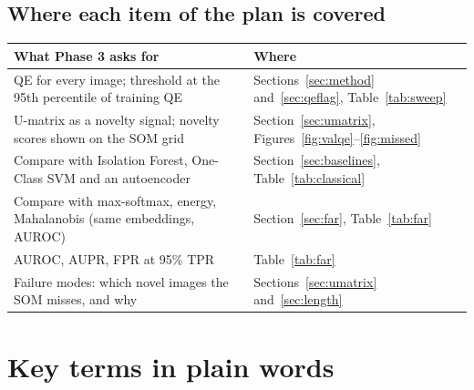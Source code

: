 \documentclass[11pt]{article}
\begin{document}
\subsection*{Where each item of the plan is covered}

{\small
\renewcommand{\arraystretch}{1.12}
\begin{tabularx}{\textwidth}{|>{\raggedright\arraybackslash}p{}|X|}
\hline
\textbf{What Phase 3 asks for} & \textbf{Where} \\ \hline
QE for every image; threshold at the 95th percentile of training QE & Sections~\ref{sec:method} and~\ref{sec:qeflag}, Table~\ref{tab:sweep} \\ \hline
U-matrix as a novelty signal; novelty scores shown on the SOM grid & Section~\ref{sec:umatrix}, Figures~\ref{fig:valqe}--\ref{fig:missed} \\ \hline
Compare with Isolation Forest, One-Class SVM and an autoencoder & Section~\ref{sec:baselines}, Table~\ref{tab:classical} \\ \hline
Compare with max-softmax, energy, Mahalanobis (same embeddings, AUROC) & Section~\ref{sec:far}, Table~\ref{tab:far} \\ \hline
AUROC, AUPR, FPR at 95\% TPR & Table~\ref{tab:far} \\ \hline
Failure modes: which novel images the SOM misses, and why & Sections~\ref{sec:umatrix} and~\ref{sec:length} \\ \hline
\end{tabularx}}

\section{Key terms in plain words}
\end{document}
